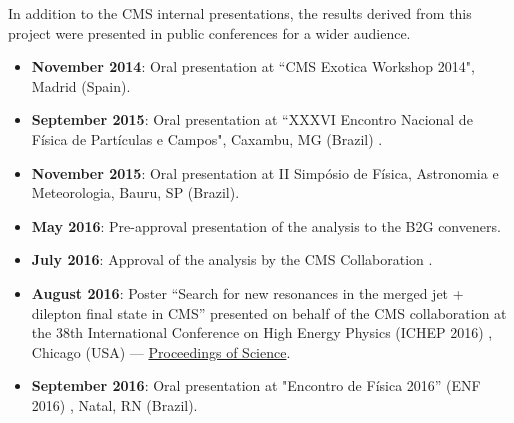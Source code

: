 In addition to the CMS internal presentations, the results derived from this project were presented in public conferences for a wider audience. 

\begin{itemize}
\item {\bf November 2014}: Oral presentation at ``CMS Exotica Workshop 2014", Madrid (Spain).
\item {\bf September 2015}: Oral presentation at ``XXXVI Encontro Nacional de F\'isica de Part\'iculas e Campos", Caxambu, MG (Brazil) \cite{ENF2015}.
\item {\bf November 2015}: Oral presentation at II Simp\'osio de F\'isica, Astronomia e Meteorologia, Bauru, SP (Brazil).
\item {\bf May 2016}: Pre-approval presentation of the analysis to the B2G conveners.
\item {\bf July 2016}: Approval of the analysis by the CMS Collaboration \cite{CMS-PAS-B2G-16-010}.
\item {\bf August 2016}: Poster ``Search for new resonances in the merged jet + dilepton final state in CMS''
presented on behalf of the CMS collaboration at the 38th International Conference on High Energy Physics (ICHEP 2016) \cite{Proceedings:2016pwg}, Chicago (USA) --- \href{https://pos.sissa.it/archive/conferences/282/757/ICHEP2016_757.pdf}{Proceedings of Science}.
\item {\bf September 2016}: Oral presentation at "Encontro de F\'isica 2016'' (ENF 2016) \cite{ENF2016}, Natal, RN (Brazil).
\end{itemize}  



